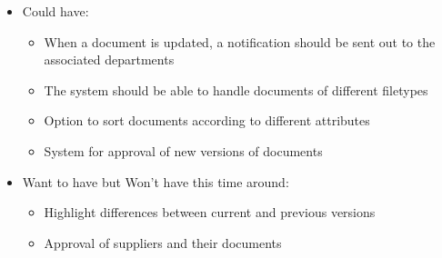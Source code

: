 \begin{itemize}
\begin{itemize}
        \end{itemize}
    \item Could have:
        \begin{itemize}
            \item When a document is updated, a notification should be sent out to the associated departments
            \item The system should be able to handle documents of different filetypes
            \item Option to sort documents according to different attributes
            \item System for approval of new versions of documents
        \end{itemize}
    \item Want to have but Won't have this time around:
        \begin{itemize}
            \item Highlight differences between current and previous versions
            \item Approval of suppliers and their documents
        \end{itemize}
\end{itemize}
